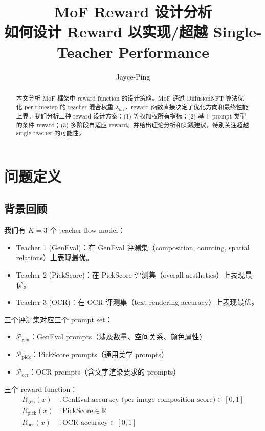 \documentclass[11pt,a4paper]{article}
\title{\textbf{MoF Reward 设计分析}\\[0.3em]
\large 如何设计 Reward 以实现/超越 Single-Teacher Performance}
\author{Jayce-Ping}
\date{}
\newcommand{\R}{\mathbb{R}}
\theoremstyle{definition}
\begin{document}
\maketitle

\begin{abstract}
本文分析 MoF 框架中 reward function 的设计策略。MoF 通过 DiffusionNFT 算法优化 per-timestep 的 teacher 混合权重 $\lambda_{k,i}$，reward 函数直接决定了优化方向和最终性能上界。我们分析三种 reward 设计方案：(1) 等权加权所有指标；(2) 基于 prompt 类型的条件 reward；(3) 多阶段自适应 reward。并给出理论分析和实践建议，特别关注超越 single-teacher 的可能性。
\end{abstract}

\tableofcontents
\newpage

\section{问题定义}

\subsection{背景回顾}

我们有 $K=3$ 个 teacher flow model：
\begin{itemize}[leftmargin=1.5em]
\item Teacher 1 (GenEval)：在 GenEval 评测集（composition, counting, spatial relations）上表现最优。
\item Teacher 2 (PickScore)：在 PickScore 评测集（overall aesthetics）上表现最优。
\item Teacher 3 (OCR)：在 OCR 评测集（text rendering accuracy）上表现最优。
\end{itemize}

三个评测集对应三个 prompt set：
\begin{itemize}[leftmargin=1.5em]
\item $\mathcal{P}_{\mathrm{gen}}$：GenEval prompts（涉及数量、空间关系、颜色属性）
\item $\mathcal{P}_{\mathrm{pick}}$：PickScore prompts（通用美学 prompts）
\item $\mathcal{P}_{\mathrm{ocr}}$：OCR prompts（含文字渲染要求的 prompts）
\end{itemize}

三个 reward function：
\begin{align}
R_{\mathrm{gen}}(x) &: \text{GenEval accuracy (per-image composition score)} \in [0, 1] \\
R_{\mathrm{pick}}(x) &: \text{PickScore} \in \R \\
R_{\mathrm{ocr}}(x) &: \text{OCR accuracy} \in [0, 1]
\end{align}
\end{document}
